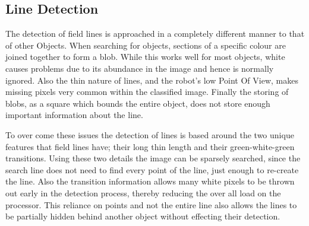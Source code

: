 \subsection{Line Detection}

The detection of field lines is approached in a completely different manner to that of other Objects. When searching for objects, sections of a specific colour are joined together to form a blob. While this works well for most objects, white causes problems due to its abundance in the image and hence is normally ignored. Also the thin nature of lines, and the robot's low Point Of View, makes missing pixels very common within the classified image. Finally the storing of blobs, as a square which bounds the entire object, does not store enough important information about the line.

To over come these issues the detection of lines is based around the two unique features that field lines have; their long thin length and their green-white-green transitions. Using these two details the image can be sparsely searched, since the search line does not need to find every point of the line, just enough to re-create the line. Also the transition information allows many white pixels to be thrown out early in the detection process, thereby reducing the over all load on the processor. This reliance on points and not the entire line also allows the lines to be partially hidden behind another object without effecting their detection.

